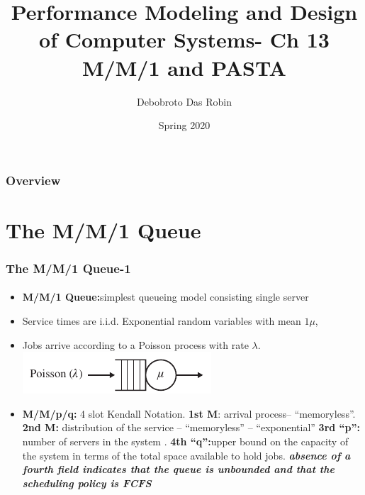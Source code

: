 \documentclass{beamer}
\title{Performance Modeling and
Design of Computer Systems- Ch 13 \\
M/M/1 and PASTA}
\author{Debobroto Das Robin} %
\institute{Kent State University}
\date{Spring 2020}
\begin{document}
\begin{frame}
        \titlepage
        \begin{center}
    \href{mailto:drobin@kent.edu}{}
        \end{center}
\end{frame}

\begin{frame}
\frametitle{Overview} %
\tableofcontents %
\end{frame}



\section {The M/M/1 Queue }



\begin{frame} 
\frametitle{The M/M/1 Queue-1 }
\framesubtitle{\textbf{\textit{}}}
\begin{itemize}
\item  \textbf{M/M/1 Queue:}simplest queueing model consisting single server 
\item Service times are i.i.d. Exponential random variables with mean $1\mu$,  
\item Jobs arrive according to a Poisson process with rate $\lambda$. 
\includegraphics[scale=.7]{images/mm1queu.jpeg}
\item \textbf{M/M/p/q:} 4 slot Kendall Notation. \textbf{1st M}: arrival process-- ``memoryless''. \textbf{2nd M:} distribution of the service -- ``memoryless'' -- ``exponential'' \textbf{3rd ``p'':}  number of servers in the system . \textbf{4th ``q'':}upper bound on the capacity of the system in terms of the total space available to hold jobs. \textbf{\textit{absence of a fourth field
indicates that the queue is unbounded and that the scheduling policy is FCFS}}

\end{itemize}

\end{frame}
\end{document}
